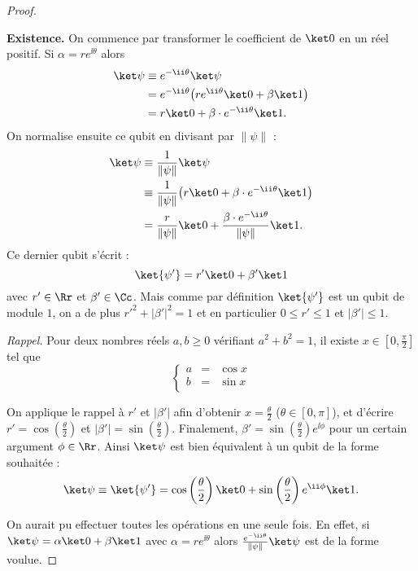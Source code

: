 \documentclass[11pt,class=report,crop=false]{standalone}
\begin{document}
\begin{proof}
~

\textbf{Existence.}
On commence par transformer le coefficient de $\ket0$ en un réel positif. Si $\alpha = re^{\ii\theta}$ alors
\begin{align*}
\ket\psi 
  &\equiv e^{-\ii\theta}\ket\psi \\
  &= e^{-\ii\theta}\big( re^{\ii\theta} \ket0 + \beta\ket1\big) \\
  &= r\ket0 + \beta \cdot e^{-\ii\theta} \ket1. \\
\end{align*}
On normalise ensuite ce qubit en divisant par $\|\psi\|$ :
\begin{align*}
\ket\psi 
  &\equiv \frac{1}{\|\psi\|} \ket\psi \\
  &\equiv \frac{1}{\|\psi\|}\big(r\ket0 + \beta \cdot e^{-\ii\theta} \ket1\big) \\
  &= \frac{r}{\|\psi\|}\ket0 + \frac{\beta \cdot e^{-\ii\theta}}{\|\psi\|} \ket1. \\
\end{align*}
Ce dernier qubit s'écrit :
$$\ket{\psi'} = r'\ket0 + \beta'\ket1$$
avec $r' \in \Rr$ et $\beta'\in \Cc$. 
Mais comme par définition $\ket{\psi'}$ est un qubit de module $1$, on a de plus 
$r'^2+ |\beta'|^2 = 1$
et en particulier $0\le r' \le 1$ et $|\beta'| \le 1$. 

\bigskip
\emph{Rappel.} Pour deux nombres réels $a,b\ge0$ vérifiant $a^2+b^2=1$, il existe $x\in[0,\frac\pi2]$ tel que
$$\left\{\begin{array}{rcl}
a &=& \cos x\\
b &=& \sin x\\
\end{array}\right.$$


On applique le rappel à $r'$ et $|\beta'|$ afin d'obtenir $x = \frac\theta2$ ($\theta \in [0,\pi]$), et d'écrire
$r' = \cos\left(\frac\theta2\right)$ et $|\beta'| = \sin\left(\frac\theta2\right)$.
Finalement, $\beta' = \sin\left(\frac\theta2\right) e^{\ii\phi}$ pour un certain argument $\phi\in\Rr$.
Ainsi $\ket\psi$ est bien équivalent à un qubit de la forme souhaitée : 
$$\ket\psi \equiv \ket{\psi'} = \cos\left(\frac\theta2\right)\ket0+ \sin\left(\frac\theta2\right)e^{\ii\phi}\ket1.$$

\bigskip
On aurait pu effectuer toutes les opérations en une seule fois. En effet,
si $\ket\psi = \alpha\ket0 + \beta\ket1$ avec $\alpha = re^{\ii\theta}$ alors
$\frac{e^{-\ii\theta}}{\|\psi\|} \ket\psi$ est de la forme voulue.


\end{proof}
\end{document}
